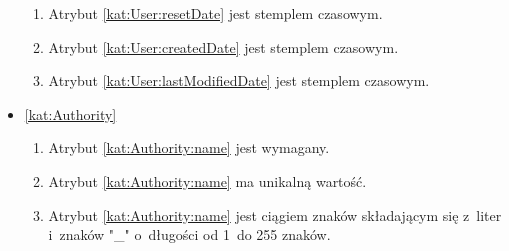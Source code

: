 \begin{itemize}[label={\textbf{Ograniczenia dla}}, wide, labelwidth=!, labelindent=0pt]
\begin{enumerate}[label={\textbf{OGR/1/\protect\twodigits{\arabic{enumi}}}}, wide, labelwidth=!, align=left, leftmargin=3cm]
        \item Atrybut \ref{kat:User:resetDate} jest stemplem czasowym.
        \item Atrybut \ref{kat:User:createdDate} jest stemplem czasowym.
        \item Atrybut \ref{kat:User:lastModifiedDate} jest stemplem czasowym.
    \end{enumerate}
    \item\ref{kat:Authority}\mynobreakpar
    \begin{enumerate}[label={\textbf{OGR/1/\protect\twodigits{\arabic{enumi}}}}, wide, labelwidth=!, align=left, leftmargin=3cm, resume]
        \item Atrybut \ref{kat:Authority:name} jest wymagany.
        \item Atrybut \ref{kat:Authority:name} ma unikalną wartość.
        \item Atrybut \ref{kat:Authority:name} jest ciągiem znaków składającym się z~liter i~znaków "\_" o~długości od 1~do 255 znaków.
    \end{enumerate}


\end{itemize}
